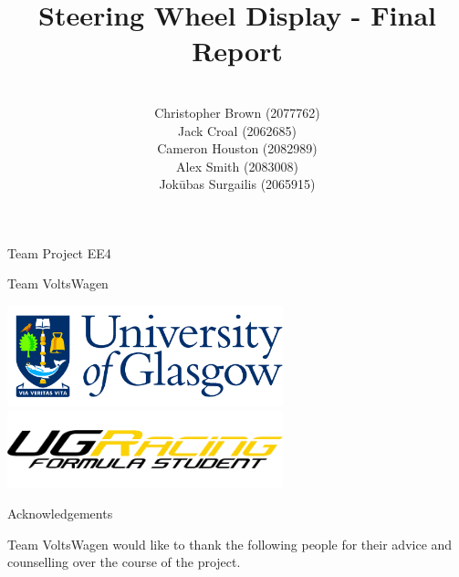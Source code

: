 \documentclass[a4paper,12pt]{article}
\author{\vspace{1cm} \\
        Christopher Brown (2077762) \\
        Jack Croal (2062685) \\
        Cameron Houston (2082989) \\
        Alex Smith (2083008) \\
        Jok\=ubas Surgailis (2065915) \\
}
\date{}
\title{\vspace{1.0cm}Steering Wheel Display - Final Report\vspace{1.0cm}}
\begin{document}
\maketitle

\thispagestyle{empty}

\begin{center}
\Large{Team Project EE4}
\end{center}

\begin{center}
\huge{Team VoltsWagen}
\end{center}

\vspace{2.0cm}

\begin{center}
\includegraphics[width=8cm]{Figures/uni_logo.png}
\includegraphics[width=8cm]{Figures/ugr_logo_black.png}
\end{center}

\newpage
\clearpage
{}



\newpage
{\Huge Acknowledgements} \\

{\large

  \vspace{1.0cm}

  Team VoltsWagen would like to thank the following people for their advice and counselling over the course of the project. \\

  \vspace{1.0cm}


}
\end{document}
